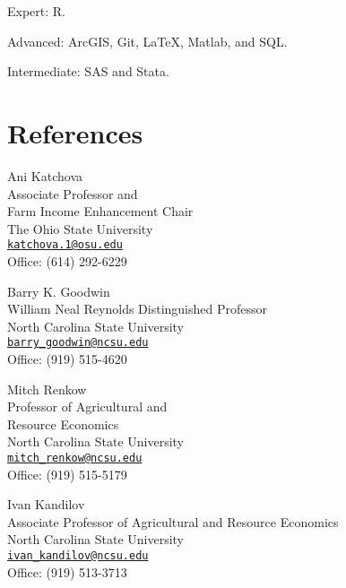\documentclass[letterpaper]{article}
\renewenvironment{itemize}{
  \begin{list}{}{
    \setlength{\leftmargin}{1.5em}
  }
}{
  \end{list}
}
\begin{document}
\begin{itemize}
\item Expert: R.
\item Advanced: ArcGIS, Git, \LaTeX, Matlab, and SQL.
\item Intermediate: SAS and Stata.
\end{itemize}


\section*{References}

\begin{multicols}{2}
\begin{itemize}
\item Ani Katchova \\ Associate Professor and \\ Farm Income Enhancement Chair \\ The Ohio State University \\ \href{mailto:katchova.1@osu.edu}{\tt katchova.1@osu.edu} \\ Office: (614) 292-6229
\item Barry K. Goodwin \\ William Neal Reynolds Distinguished Professor \\ North Carolina State University \\ \href{mailto:barry\_goodwin@ncsu.edu}{\tt barry\_goodwin@ncsu.edu} \\ Office: (919) 515-4620

\item Mitch Renkow \\ Professor of Agricultural and \\ Resource Economics \\ North Carolina State University \\ \href{mailto:mitch\_renkow@ncsu.edu}{\tt mitch\_renkow@ncsu.edu} \\ Office: (919) 515-5179
\item Ivan Kandilov \\ Associate Professor of Agricultural and Resource Economics \\ North Carolina State University \\ \href{mailto:ivan\_kandilov@ncsu.edu}{\tt ivan\_kandilov@ncsu.edu} \\ Office: (919) 513-3713
\end{itemize}
\end{multicols}
\end{document}
